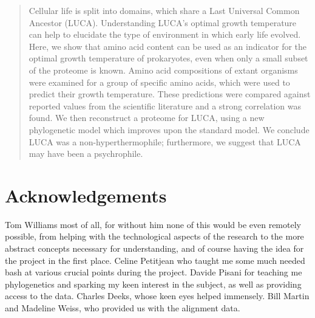 



\begin{abstract}
\noindent Cellular life is split into domains, which share a Last Universal Common
Ancestor (LUCA). Understanding LUCA’s optimal growth temperature can help to elucidate the type of environment in which early life evolved. Here, we show that amino acid content can be used as an indicator for the optimal growth temperature of prokaryotes, even when only a small subset of the proteome is known. Amino acid compositions of extant organisms were examined for a group of specific amino acids, which were used to predict their growth temperature. These predictions were compared against reported values from the scientific literature and a strong correlation was found. We then reconstruct a proteome for LUCA, using a new phylogenetic model which improves upon the standard model. We conclude LUCA was a non-hyperthermophile; furthermore, we suggest that LUCA may have been a psychrophile. 




\end{abstract}
\newpage
\section{Acknowledgements}

Tom Williams most of all, for without him none of this would be even remotely possible, from helping with the technological aspects of the research to the more abstract concepts necessary for understanding, and of course having the idea for the project in the first place. Celine Petitjean who taught me some much needed bash at various crucial points during the project. Davide Pisani for teaching me phylogenetics and sparking my keen interest in the subject, as well as providing access to the data. Charles Deeks, whose keen eyes helped immensely. Bill Martin and Madeline Weiss, who provided us with the alignment data.

